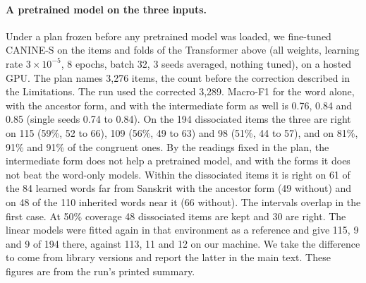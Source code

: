 \documentclass[11pt]{article}
\begin{document}
\paragraph{A pretrained model on the three inputs.} Under a plan frozen before any pretrained model was loaded, we fine-tuned CANINE-S \citep{clark2022canine} on the items and folds of the Transformer above (all weights, learning rate $3\times10^{-5}$, 8 epochs, batch 32, 3 seeds averaged, nothing tuned), on a hosted GPU. The plan names 3,276 items, the count before the correction described in the Limitations. The run used the corrected 3,289. Macro-F1 for the word alone, with the ancestor form, and with the intermediate form as well is 0.76, 0.84 and 0.85 (single seeds 0.74 to 0.84). On the 194 dissociated items the three are right on 115 (59\%, 52 to 66), 109 (56\%, 49 to 63) and 98 (51\%, 44 to 57), and on 81\%, 91\% and 91\% of the congruent ones. By the readings fixed in the plan, the intermediate form does not help a pretrained model, and with the forms it does not beat the word-only models. Within the dissociated items it is right on 61 of the 84 learned words far from Sanskrit with the ancestor form (49 without) and on 48 of the 110 inherited words near it (66 without). The intervals overlap in the first case. At 50\% coverage 48 dissociated items are kept and 30 are right. The linear models were fitted again in that environment as a reference and give 115, 9 and 9 of 194 there, against 113, 11 and 12 on our machine. We take the difference to come from library versions and report the latter in the main text. These figures are from the run's printed summary.
\end{document}
